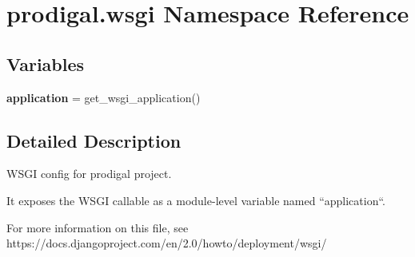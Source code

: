 \hypertarget{namespaceprodigal_1_1wsgi}{}\section{prodigal.\+wsgi Namespace Reference}
\label{namespaceprodigal_1_1wsgi}
\subsection*{Variables}
\begin{DoxyCompactItemize}
\item 
\mbox{\label{namespaceprodigal_1_1wsgi_a4d8454f871e26ed67a1df23f8cef1df7}} 
{\bfseries application} = get\+\_\+wsgi\+\_\+application()
\end{DoxyCompactItemize}


\subsection{Detailed Description}
\begin{DoxyVerb}WSGI config for prodigal project.

It exposes the WSGI callable as a module-level variable named ``application``.

For more information on this file, see
https://docs.djangoproject.com/en/2.0/howto/deployment/wsgi/
\end{DoxyVerb}
 